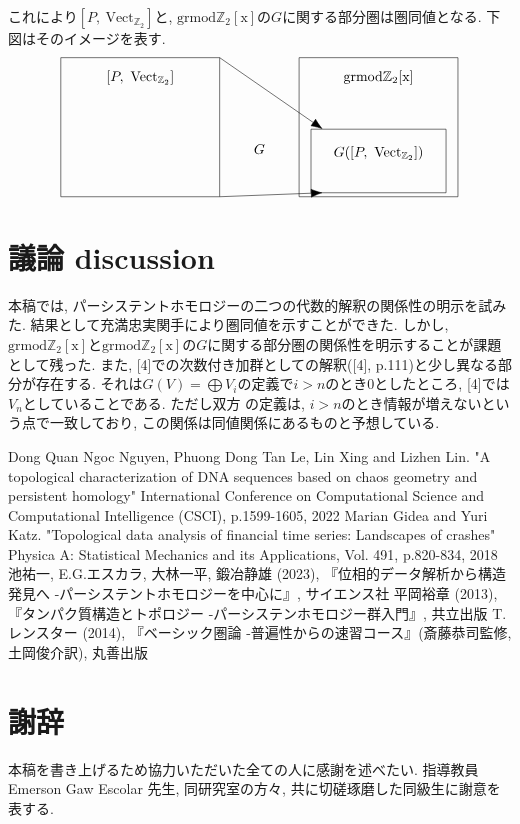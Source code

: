 \documentclass[a4paper]{jsarticle}
\theoremstyle{definition}
\newcommand{\Fun}[2]{[#1,~#2]}
\newcommand{\Vect}{{\mathrm{Vect}}}
\newcommand{\grmodZ}{{\mathrm{grmod \mathbb{Z}_2[x]}}}
\begin{document}
これにより$\Fun{P}{\Vect_{\mathbb{Z}_2}}$と, $\grmodZ$の$G$に関する部分圏は圏同値となる. 下図はそのイメージを表す.\\
\begin{equation}
    \begin{tikzpicture}
    \node at (0, 1) {$\Fun{P}{\Vect_{\mathbb{Z}_2}}$};
    \node at (6, 1) {$\grmodZ$};
    \node at (3, -0.8) {$G$};
    \node at (6, -0.9) {$G(\Fun{P}{\Vect_{\mathbb{Z}_2}})$};
    \draw (-2,-2) rectangle (2,1.5);
    \draw (4,-2) rectangle (8,1.5);
    \draw (4.3,-1.9) rectangle (7.7,-0.3);
    \draw [-{Latex[length=3mm]}]  (2,-2) -- (4.6, -1.9);
    \draw [-{Latex[length=3mm]}]  (2,1.5) -- (4.6, -0.3);
\end{tikzpicture}\notag
\end{equation}
\section{議論 discussion}
本稿では, パーシステントホモロジーの二つの代数的解釈の関係性の明示を試みた. 結果として充満忠実関手により圏同値を示すことができた. しかし, $\grmodZ$と$\grmodZ$の$G$に関する部分圏の関係性を明示することが課題として残った. また, [4]での次数付き加群としての解釈([4], p.111)と少し異なる部分が存在する. それは$G(V)=\bigoplus V_i$の定義で$i>n$のとき0としたところ, [4]では$V_n$としていることである. ただし双方
の定義は, $i>n$のとき情報が増えないという点で一致しており, この関係は同値関係にあるものと予想している.


\begin{thebibliography}{9}
    Dong Quan Ngoc Nguyen, Phuong Dong Tan Le, Lin Xing and Lizhen Lin. "A topological characterization of DNA sequences based on chaos geometry and persistent homology" International Conference on Computational Science and Computational Intelligence (CSCI), p.1599-1605, 2022
     Marian Gidea and Yuri Katz. "Topological data analysis of financial time series: Landscapes of crashes" Physica A: Statistical Mechanics and its Applications, Vol. 491, p.820-834, 2018
     池祐一, E.G.エスカラ, 大林一平, 鍛冶静雄 (2023), 『位相的データ解析から構造発見へ -パーシステントホモロジーを中心に』, サイエンス社
     平岡裕章 (2013), 『タンパク質構造とトポロジー -パーシステンホモロジー群入門』, 共立出版
     T.レンスター (2014), 『ベーシック圏論 -普遍性からの速習コース』(斎藤恭司監修, 土岡俊介訳), 丸善出版
    
\end{thebibliography}
\section*{謝辞}
本稿を書き上げるため協力いただいた全ての人に感謝を述べたい. 指導教員 Emerson Gaw Escolar 先生, 同研究室の方々, 共に切磋琢磨した同級生に謝意を表する.
\end{document}
